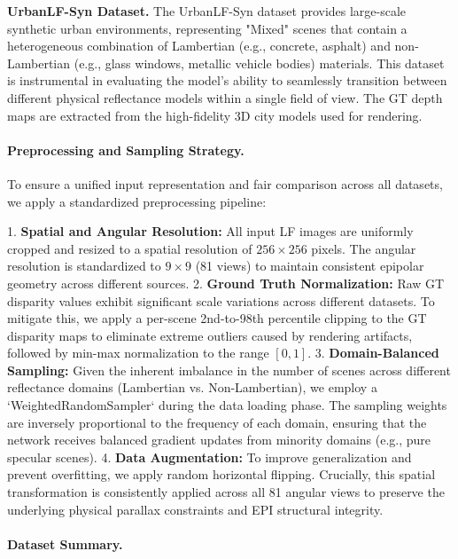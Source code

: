 \textbf{UrbanLF-Syn Dataset.} The UrbanLF-Syn dataset provides large-scale synthetic urban environments, representing "Mixed" scenes that contain a heterogeneous combination of Lambertian (e.g., concrete, asphalt) and non-Lambertian (e.g., glass windows, metallic vehicle bodies) materials. This dataset is instrumental in evaluating the model's ability to seamlessly transition between different physical reflectance models within a single field of view. The GT depth maps are extracted from the high-fidelity 3D city models used for rendering.

\paragraph{Preprocessing and Sampling Strategy.}

To ensure a unified input representation and fair comparison across all datasets, we apply a standardized preprocessing pipeline:

1. \textbf{Spatial and Angular Resolution:} All input LF images are uniformly cropped and resized to a spatial resolution of $256 \times 256$ pixels. The angular resolution is standardized to $9 \times 9$ (81 views) to maintain consistent epipolar geometry across different sources.
2. \textbf{Ground Truth Normalization:} Raw GT disparity values exhibit significant scale variations across different datasets. To mitigate this, we apply a per-scene 2nd-to-98th percentile clipping to the GT disparity maps to eliminate extreme outliers caused by rendering artifacts, followed by min-max normalization to the range $[0, 1]$.
3. \textbf{Domain-Balanced Sampling:} Given the inherent imbalance in the number of scenes across different reflectance domains (Lambertian vs. Non-Lambertian), we employ a `WeightedRandomSampler` during the data loading phase. The sampling weights are inversely proportional to the frequency of each domain, ensuring that the network receives balanced gradient updates from minority domains (e.g., pure specular scenes).
4. \textbf{Data Augmentation:} To improve generalization and prevent overfitting, we apply random horizontal flipping. Crucially, this spatial transformation is consistently applied across all 81 angular views to preserve the underlying physical parallax constraints and EPI structural integrity.

\paragraph{Dataset Summary.}


